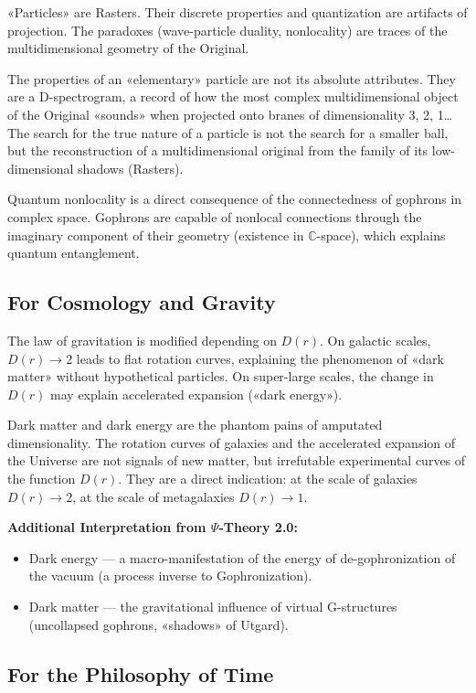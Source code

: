 \documentclass[a4paper,12pt]{article}
\begin{document}
	«Particles» are Rasters. Their discrete properties and quantization are artifacts of projection. The paradoxes (wave-particle duality, nonlocality) are traces of the multidimensional geometry of the Original.
	
	The properties of an «elementary» particle are not its absolute attributes. They are a D-spectrogram, a record of how the most complex multidimensional object of the Original «sounds» when projected onto branes of dimensionality 3, 2, 1\dots The search for the true nature of a particle is not the search for a smaller ball, but the reconstruction of a multidimensional original from the family of its low-dimensional shadows (Rasters).
	
	Quantum nonlocality is a direct consequence of the connectedness of gophrons in complex space. Gophrons are capable of nonlocal connections through the imaginary component of their geometry (existence in $\mathbb{C}$-space), which explains quantum entanglement.
	
	\subsection{For Cosmology and Gravity}
	
	The law of gravitation is modified depending on $D(r)$. On galactic scales, $D(r) \to 2$ leads to flat rotation curves, explaining the phenomenon of «dark matter» without hypothetical particles. On super-large scales, the change in $D(r)$ may explain accelerated expansion («dark energy»).
	
	Dark matter and dark energy are the phantom pains of amputated dimensionality. The rotation curves of galaxies and the accelerated expansion of the Universe are not signals of new matter, but irrefutable experimental curves of the function $D(r)$. They are a direct indication: at the scale of galaxies $D(r) \to 2$, at the scale of metagalaxies $D(r) \to 1$.
	
	\textbf{Additional Interpretation from $\Psi$-Theory 2.0:}
	\begin{itemize}
		\item Dark energy — a macro-manifestation of the energy of de-gophronization of the vacuum (a process inverse to Gophronization).
		\item Dark matter — the gravitational influence of virtual G-structures (uncollapsed gophrons, «shadows» of Utgard).
	\end{itemize}
	
	\subsection{For the Philosophy of Time}
	
\end{document}
